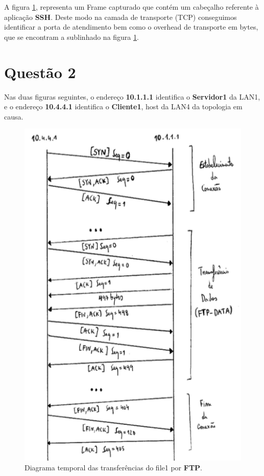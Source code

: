 \documentclass{llncs}
\begin{document}
A figura \ref{fig:ssh}, representa um Frame capturado que contém um cabeçalho referente à aplicação \textbf{SSH}. Deste modo na camada de transporte (TCP) conseguimos identificar a porta de atendimento bem como o overhead de transporte em bytes, que se encontram a sublinhado na figura \ref{fig:ssh}.


\section{Questão 2}

Nas duas figuras seguintes, o endereço \textbf{10.1.1.1} identifica o \textbf{Servidor1} da LAN1, e o endereço \textbf{10.4.4.1} identifica o \textbf{Cliente1}, host da LAN4 da topologia em causa.

\begin{figure}[H]
\begin{center}
\includegraphics[scale=0.5]{2_ftp.png}
\end{center}
\caption{\label{fig:ssh}Diagrama temporal das transferências do file1 por \textbf{FTP}.}
\end{figure}
\end{document}
